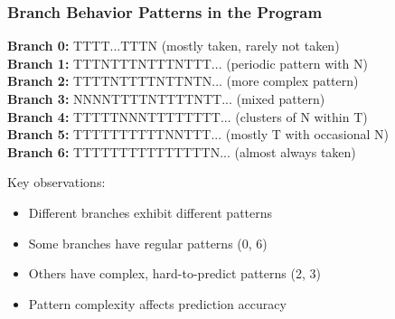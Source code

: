 \documentclass[aspectratio=169,12pt]{beamer}
\begin{document}
\begin{frame}
  \frametitle{Branch Behavior Patterns in the Program}
  
  \tiny
  \begin{tcolorbox}[colback=gray!5, colframe=gray!50]
    \textbf{Branch 0:} TTTT...TTTN (mostly taken, rarely not taken)\\
    \vspace{0.2em}
    \textbf{Branch 1:} TTTNTTTNTTTNTTT... (periodic pattern with N)\\
    \vspace{0.2em}
    \textbf{Branch 2:} TTTTNTTTTNTTNTN... (more complex pattern)\\
    \vspace{0.2em}
    \textbf{Branch 3:} NNNNTTTTNTTTTNTT... (mixed pattern)\\
    \vspace{0.2em}
    \textbf{Branch 4:} TTTTTNNNTTTTTTTT... (clusters of N within T)\\
    \vspace{0.2em}
    \textbf{Branch 5:} TTTTTTTTTTNNTTT... (mostly T with occasional N)\\
    \vspace{0.2em}
    \textbf{Branch 6:} TTTTTTTTTTTTTTTN... (almost always taken)
  \end{tcolorbox}
  
  \normalsize
  \vspace{0.5em}
  Key observations:
  \begin{itemize}
    \item Different branches exhibit different patterns
    \item Some branches have regular patterns (0, 6)
    \item Others have complex, hard-to-predict patterns (2, 3)
    \item Pattern complexity affects prediction accuracy
  \end{itemize}
\end{frame}
\end{document}
